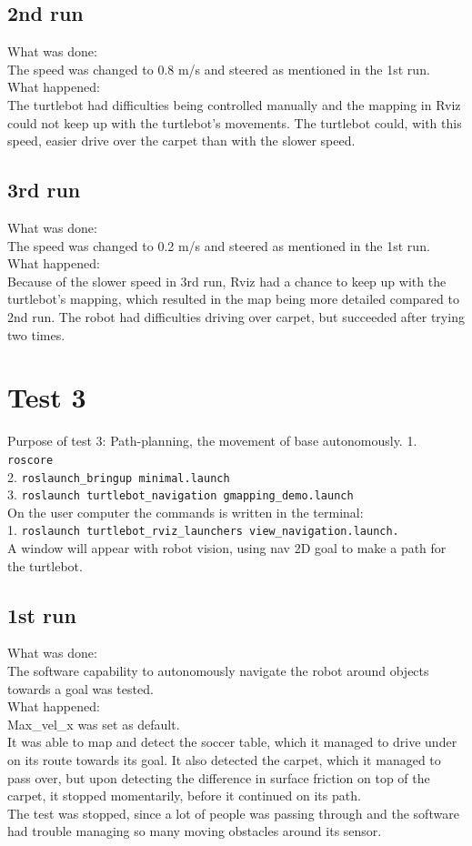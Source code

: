 \subsection{2nd run}
What was done:\\
The speed was changed to 0.8 m/s and steered as mentioned in the 1st run.\\
What happened:\\
The turtlebot had difficulties being controlled manually and the mapping in Rviz could not keep up with the turtlebot's movements. The turtlebot could, with this speed, easier drive over the carpet than with the slower speed.

\subsection{3rd run}
What was done:\\
The speed was changed to 0.2 m/s and steered as mentioned in the 1st run.\\
What happened:\\
Because of the slower speed in 3rd run, Rviz had a chance to keep up with the turtlebot's mapping, which resulted in the map being more detailed compared to 2nd run. The robot had difficulties driving over carpet, but succeeded after trying two times.

%
%

\section{Test 3}
Purpose of test 3: Path-planning, the movement of base autonomously. 
1. \texttt{roscore}\\
2. \texttt{roslaunch\_bringup minimal.launch}\\
3. \texttt{roslaunch turtlebot\_navigation gmapping\_demo.launch}\\
On the user computer the commands is written in the terminal:\\
1. \texttt{roslaunch turtlebot\_rviz\_launchers view\_navigation.launch.}\\
A window will appear with robot vision, using nav 2D goal to make a path for the turtlebot.

\subsection{1st run}
What was done:\\
The software capability to autonomously navigate the robot around objects towards a goal was tested.\\
What happened:\\
Max\_vel\_x was set as default.\\
It was able to map and detect  the soccer table, which it managed to drive under on its route towards its goal. It also detected the carpet, which it managed to pass over, but upon detecting the difference in surface friction on top of the carpet, it stopped momentarily, before it continued on its path.\\
The test was stopped, since a lot of people was passing through and the software had trouble managing so many moving obstacles around its sensor.

